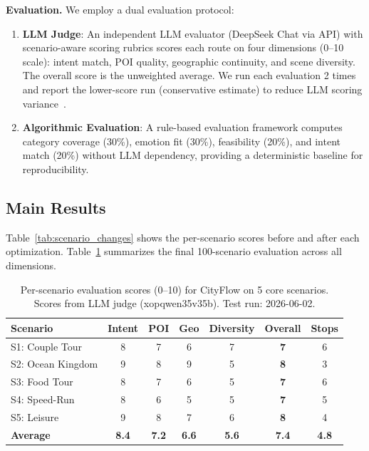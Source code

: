 \textbf{Evaluation.} We employ a dual evaluation protocol:
\begin{enumerate}[leftmargin=*]
    \item \textbf{LLM Judge}: An independent LLM evaluator (DeepSeek Chat via API) with scenario-aware scoring rubrics scores each route on four dimensions (0--10 scale): intent match, POI quality, geographic continuity, and scene diversity. The overall score is the unweighted average. We run each evaluation 2 times and report the lower-score run (conservative estimate) to reduce LLM scoring variance~\cite{gu2024llmjudge}.
    \item \textbf{Algorithmic Evaluation}: A rule-based evaluation framework computes category coverage (30\%), emotion fit (30\%), feasibility (20\%), and intent match (20\%) without LLM dependency, providing a deterministic baseline for reproducibility.
\end{enumerate}

\subsection{Main Results}

Table~\ref{tab:scenario_changes} shows the per-scenario scores before and after each optimization. Table~\ref{tab:main_results} summarizes the final 100-scenario evaluation across all dimensions.

\begin{table}[H]
\centering
\caption{Per-scenario evaluation scores (0--10) for CityFlow on 5 core scenarios. Scores from LLM judge (xopqwen35v35b). Test run: 2026-06-02.}
\label{tab:main_results}
\begin{tabular}{@{}lcccccc@{}}
\toprule
\textbf{Scenario} & \textbf{Intent} & \textbf{POI} & \textbf{Geo} & \textbf{Diversity} & \textbf{Overall} & \textbf{Stops} \\
\midrule
S1: Couple Tour & 8 & 7 & 6 & 7 & \textbf{7} & 6 \\
S2: Ocean Kingdom & 9 & 8 & 9 & 5 & \textbf{8} & 3 \\
S3: Food Tour & 8 & 7 & 6 & 5 & \textbf{7} & 6 \\
S4: Speed-Run & 8 & 6 & 5 & 5 & \textbf{7} & 5 \\
S5: Leisure & 9 & 8 & 7 & 6 & \textbf{8} & 4 \\
\midrule
\textbf{Average} & \textbf{8.4} & \textbf{7.2} & \textbf{6.6} & \textbf{5.6} & \textbf{7.4} & \textbf{4.8} \\
\bottomrule
\end{tabular}
\end{table}

